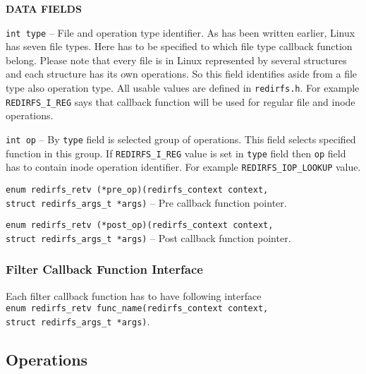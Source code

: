 \begin{list}{}{}
	\item \textbf{DATA FIELDS}
		\begin{list}{}{}
			\item \texttt{int type} -- File and operation type identifier. As
				has been written earlier, Linux has seven file types. Here
				has to be specified to which file type callback
				function belong. Please note that every file is in
				Linux represented by several structures and each
				structure has its own operations. So this field
				identifies aside from a file type also operation type.
				All usable values are defined in \texttt{redirfs.h}.
				For example \texttt{REDIRFS\_I\_REG} says that
				callback function will be used for regular file and inode
				operations.
			\item \texttt{int op} -- By \texttt{type} field is selected
				group of operations. This field selects specified
				function in this group. If \texttt{REDIRFS\_I\_REG} value is
				set in \texttt{type} field then \texttt{op} field has to
				contain inode operation identifier. For example
				\texttt{REDIRFS\_IOP\_LOOKUP} value.
			\item \texttt{enum redirfs\_retv (*pre\_op)(redirfs\_context
				context,\\struct redirfs\_args\_t *args)} -- Pre
				callback function pointer.
			\item \texttt{enum redirfs\_retv (*post\_op)(redirfs\_context
				context,\\struct redirfs\_args\_t *args)} -- Post
				callback function pointer.
		\end{list}
\end{list}

\subsubsection{Filter Callback Function Interface}
Each filter callback function has to have following interface \\
\texttt{enum redirfs\_retv func\_name(redirfs\_context context,\\struct redirfs\_args\_t *args)}.

\subsection{Operations}

